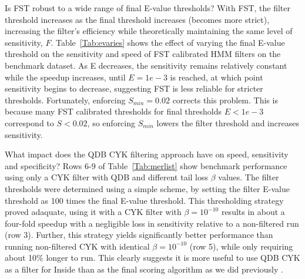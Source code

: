 Is FST robust to a wide range of final E-value thresholds? With FST,
the filter threshold increases as the final threshold increases
(becomes more strict), increasing the filter's efficiency while
theoretically maintaining the same level of sensitivity,
$F$. Table~\ref{Tab:evaries} shows the effect of varying the final
E-value threshold on the sensitivity and speed of FST calibrated HMM
filters on the benchmark dataset. As E decreases, the sensitivity
remains relatively constant while the speedup increases, until
$E=1e-3$ is reached, at which point sensitivity begins to decrease,
suggesting FST is less reliable for stricter thresholds.  Fortunately,
enforcing $S_{min}=0.02$ corrects this problem. This is because many
FST calibrated thresholds for final thresholds $E<1e-3$ correspond to
$S<0.02$, so enforcing $S_{min}$ lowers the filter threshold and
increases sensitivity. 

\begin{comment}
In general, the sensitivity remains
relatively constant as the final threshold and the acceleration due to
the filters increases modestly. 
Note that an E-value cutoff of 0.0001
in a 10 Mb database corresponds to the same bit score cutoff as an
E-value cutoff of 1.0 in a 100 Gb database. Because FST calibrated
filter thresholds depend only on the final bit score cutoff, identical
(theoretical) acceleration due to filtering would occur in both of
these searches.
\end{comment}

What impact does the QDB CYK filtering approach have on speed,
sensitivity and specificity?  Rows 6-9 of Table~\ref{Tab:merlist} show
benchmark performance using only a CYK filter with QDB and different
tail loss $\beta$ values.  The filter thresholds were determined using
a simple scheme, by setting the filter E-value threshold as 100 times
the final E-value threshold. This thresholding strategy proved
adaquate, using it with a CYK filter with $\beta=10^{-10}$ results in
about a four-fold speedup with a negligible loss in sensitivity
relative to a non-filtered run (row 3).  Further, this strategy yields
significantly better performance than running non-filtered CYK with
identical $\beta=10^{-10}$ (row 5), while only requiring about 10\%
longer to run.  This clearly suggests it is more useful to use QDB CYK
as a filter for Inside than as the final scoring algorithm as we did
previously \citep{NawrockiEddy07}.

